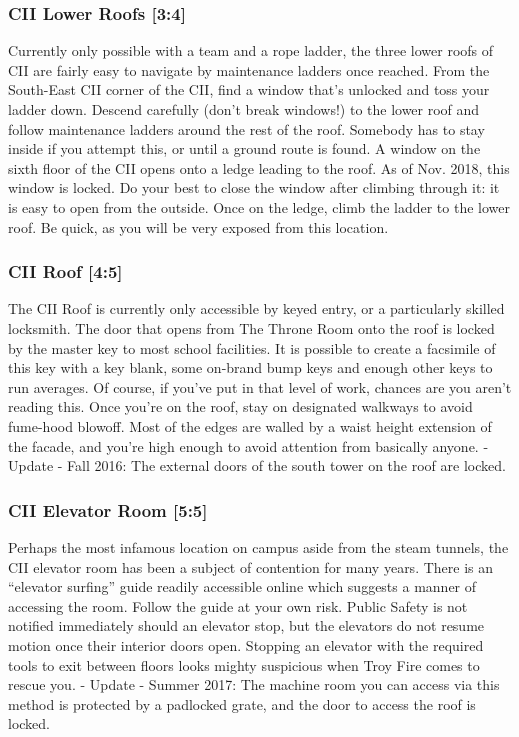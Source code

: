 \documentclass{article}
\begin{document}
\subsubsection{CII Lower Roofs [3:4]}
Currently only possible with a team and a rope ladder, the three lower roofs of CII are fairly easy to navigate by maintenance ladders once reached. From the South-East CII corner of the CII, find a window that’s unlocked and toss your ladder down. Descend carefully (don’t break windows!) to the lower roof and follow maintenance ladders around the rest of the roof. Somebody has to stay inside if you attempt this, or until a ground route is found.
A window on the sixth floor of the CII opens onto a ledge leading to the roof. As of Nov. 2018, this window is locked. Do your best to close the window after climbing through it: it is easy to open from the outside. Once on the ledge, climb the ladder to the lower roof. Be quick, as you will be very exposed from this location.

 \subsubsection{CII Roof [4:5]}
The CII Roof is currently only accessible by keyed entry, or a particularly skilled locksmith. The door that opens from The Throne Room onto the roof is locked by the master key to most school facilities. It is possible to create a facsimile of this key with a key blank, some on-brand bump keys and enough other keys to run averages. Of course, if you’ve put in that level of work, chances are you aren’t reading this. Once you’re on the roof, stay on designated walkways to avoid fume-hood blowoff. Most of the edges are walled by a waist height extension of the facade, and you’re high enough to avoid attention from basically anyone.
- Update - Fall 2016: The external doors of the south tower on the roof are locked.
\subsubsection{CII Elevator Room [5:5]}
Perhaps the most infamous location on campus aside from the steam tunnels, the CII elevator room has been a subject of contention for many years. There is an “elevator surfing” guide readily accessible online which suggests a manner of accessing the room. Follow the guide at your own risk. Public Safety is not notified immediately should an elevator stop, but the elevators do not resume motion once their interior doors open. Stopping an elevator with the required tools to exit between floors looks mighty suspicious when Troy Fire comes to rescue you.
- Update - Summer 2017: The machine room you can access via this method is protected by a padlocked grate, and the door to access the roof is locked.
\end{document}

